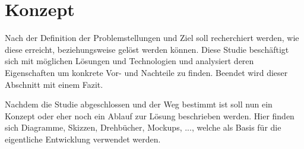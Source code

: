 \chapter{Konzept}
Nach der Definition der Problemstellungen und Ziel soll recherchiert werden, wie diese erreicht, beziehungsweise gelöst werden können. Diese Studie beschäftigt sich mit möglichen Lösungen und Technologien und analysiert deren Eigenschaften um konkrete Vor- und Nachteile zu finden.
Beendet wird dieser Abschnitt mit einem Fazit.

Nachdem die Studie abgeschlossen und der Weg bestimmt ist soll nun ein Konzept oder eher noch ein Ablauf zur Lösung beschrieben werden. Hier finden sich Diagramme, Skizzen, Drehbücher, Mockups, ..., welche als Basis für die eigentliche Entwicklung verwendet werden.
